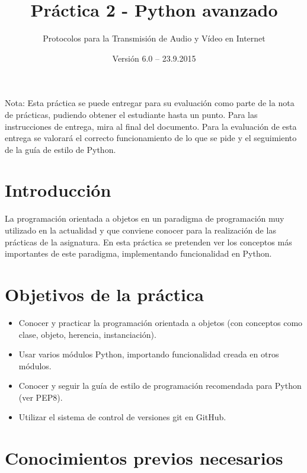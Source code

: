 \documentclass[11pt,a4paper]{article}
\begin{document}
\title{Práctica 2 - Python avanzado}
\author{Protocolos para la Transmisión de Audio y Vídeo en Internet}
\date{Versión 6.0 – 23.9.2015}


\maketitle


Nota: Esta práctica se puede entregar para su evaluación como parte de la nota de prácticas, pudiendo obtener el estudiante hasta un punto. Para las instrucciones de entrega, mira al final del documento. Para la evaluación de esta entrega se valorará el correcto funcionamiento de lo que se pide y el seguimiento de la guía de estilo de Python.

\section{Introducción}

La programación orientada a objetos en un paradigma de programación muy utilizado en la actualidad y que conviene conocer para la realización de las prácticas de la asignatura. En esta práctica se pretenden ver los conceptos más importantes de este paradigma, implementando funcionalidad en Python.


\section{Objetivos de la práctica}

\begin{itemize}
  \item Conocer y practicar la programación orientada a objetos (con conceptos como clase, objeto, herencia, instanciación).
  \item Usar varios módulos Python, importando funcionalidad creada en otros módulos.
  \item Conocer y seguir la guía de estilo de programación recomendada para Python (ver PEP8).
  \item Utilizar el sistema de control de versiones git en GitHub.
\end{itemize}

\section{Conocimientos previos necesarios}
\end{document}
